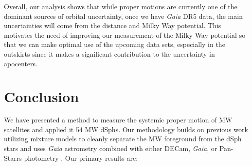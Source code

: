 \documentclass[twocolumn]{aastex63}
\begin{document}
Overall, our analysis shows that while proper motions are currently one of the dominant sources of orbital uncertainty, once we have \textit{Gaia} DR5 data, the main uncertainties will come from the distance and Milky Way potential. This motivates the need of improving our measurement of the Milky Way potential so that we can make optimal use of the upcoming data sets, especially in the outskirts since it makes a significant contribution to the uncertainty in apocenters. 









\section{Conclusion}
\label{section:conclusion}


We have presented a method to measure the systemic proper motion of MW satellites and applied it 54 MW dSphs. 
Our methodology builds on previous work utilizing mixture models to cleanly separate the MW foreground from the dSph stars and uses  {\it Gaia} astrometry combined with either DECam, {\it Gaia}, or Pan-Starrs photometry \citep{Pace2019ApJ...875...77P, McConnachie2020AJ....160..124M}.
Our primary results are:
\end{document}
